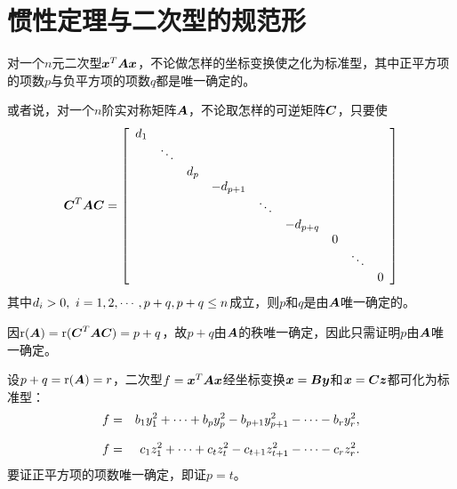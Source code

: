 \section{惯性定理与二次型的规范形}
\begin{frame}
  \begin{dingli}[惯性定理]
    对一个$n$元二次型${\boldsymbol{x}}^T\boldsymbol{A}{\boldsymbol{x}}$，不论做怎样的坐标变换使之化为标准型，其中正平方项的项数$p$与负平方项的项数$q$都是唯一确定的。

    或者说，对一个$n$阶实对称矩阵$\boldsymbol{A}$，不论取怎样的可逆矩阵$\boldsymbol{C}$，只要使
    $$
    \boldsymbol{C}^T\boldsymbol{A}\boldsymbol{C}=\left[
      \begin{array}{ccccccccc}
        d_1&&&&&&&&\\
           &\ddots&&&&&&&\\
           &&d_p&&&&&&\\
           &&&-d_{p+1}&&&&&\\
           &&&&\ddots&&&&\\
           &&&&&-d_{p+q}&&&\\
           &&&&&&0&&\\
           &&&&&&&\ddots&\\
           &&&&&&&&0\\
      \end{array}
    \right]
    $$
    其中$d_i>0, ~i=1,2,\cdots,p+q, p+q\le n$成立，则$p$和$q$是由$\boldsymbol{A}$唯一确定的。
  \end{dingli}
\end{frame}

\begin{frame}
    因$\mathrm{r}(\boldsymbol{A})=\mathrm{r}(\boldsymbol{C}^T\boldsymbol{A}\boldsymbol{C})=p+q$，故$p+q$由$\boldsymbol{A}$的秩唯一确定，因此只需证明$p$由$\boldsymbol{A}$唯一确定。 \vspace{.1in}\pause 

    设$p+q=\mathrm{r}(\boldsymbol{A})=r$，二次型$f={\boldsymbol{x}}^T\boldsymbol{A}{\boldsymbol{x}}$经坐标变换${\boldsymbol{x}}=\boldsymbol{B}{\boldsymbol{y}}$和${\boldsymbol{x}}=\boldsymbol{C}{\boldsymbol{z}}$都可化为标准型：
    \begin{eqnarray}
      f&=&b_1y_1^2+\cdots+b_py_p^2-b_{p+1}y_{p+1}^2-\cdots-b_{r}y_r^2, \\[.1in]
      f&=&c_1z_1^2+\cdots+c_tz_t^2-c_{t+1}z_{t+1}^2-\cdots-c_{r}z_r^2.
    \end{eqnarray}
    要证正平方项的项数唯一确定，即证$p=t$。
\end{frame}

